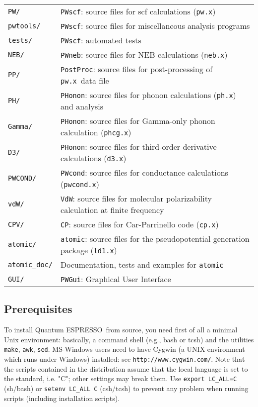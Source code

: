 \documentclass[12pt,a4paper]{article}
\def\qe{{\sc Quantum ESPRESSO}}
\def\pwx{\texttt{pw.x}}
\def\cpx{\texttt{cp.x}}
\def\phx{\texttt{ph.x}}
\def\nebx{\texttt{neb.x}}
\def\PWscf{\texttt{PWscf}}
\def\PHonon{\texttt{PHonon}}
\def\CP{\texttt{CP}}
\def\PostProc{\texttt{PostProc}}
\def\make{\texttt{make}}
\begin{document}
\begin{tabular}{ll}
\texttt{PW/}      &\PWscf: source files for scf calculations (\pwx)\\
\texttt{pwtools/} &\PWscf: source files for miscellaneous analysis programs\\
\texttt{tests/}   &\PWscf:  automated tests\\
\texttt{NEB/}     &\texttt{PWneb}: source files for NEB calculations (\nebx)\\
\texttt{PP/}      &\PostProc: source files for post-processing of \pwx\
                   data file\\
\texttt{PH/}      &\PHonon: source files for phonon calculations (\phx)
                   and analysis\\
\texttt{Gamma/}  &\PHonon: source files for Gamma-only phonon calculation
                  (\texttt{phcg.x})\\
\texttt{D3/}     &\PHonon: source files for third-order derivative 
                  calculations (\texttt{d3.x})\\
\texttt{PWCOND/} &\texttt{PWcond}: source files for conductance calculations
                  (\texttt{pwcond.x})\\
\texttt{vdW/}    &\texttt{VdW}: source files for molecular polarizability
                  calculation at finite frequency\\
\texttt{CPV/}    &\CP: source files for Car-Parrinello code (\cpx)\\
\texttt{atomic/} &\texttt{atomic}: source files for the pseudopotential
                   generation package (\texttt{ld1.x})\\
\texttt{atomic\_doc/} &Documentation, tests and examples for \texttt{atomic}\\
\texttt{GUI/}    & \texttt{PWGui}: Graphical User Interface\\
\end{tabular}

\subsection{Prerequisites}
\label{Sec:Installation}

To install \qe\ from source, you need first of all a minimal Unix 
environment: basically, a command shell (e.g.,
bash or tcsh) and the utilities \make, \texttt{awk}, \texttt{sed}.
 MS-Windows users need
to have Cygwin (a UNIX environment which runs under Windows) installed:
see \texttt{http://www.cygwin.com/}. Note that the scripts contained in the distribution
assume that the local  language is set to the standard, i.e. "C"; other
 settings 
may break them. Use \texttt{export LC\_ALL=C} (sh/bash) or
\texttt{setenv LC\_ALL C} (csh/tcsh) to prevent any problem 
when running scripts (including installation scripts).
\end{document}
